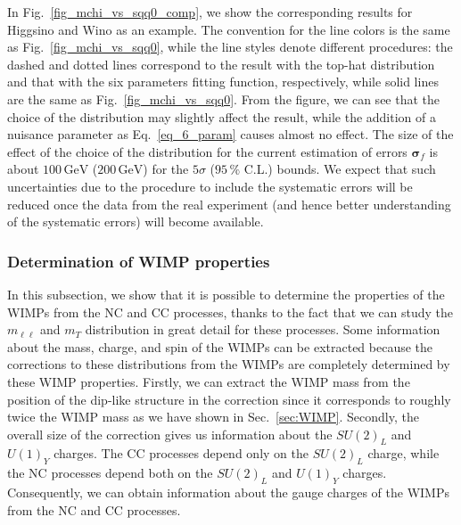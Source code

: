 \documentclass[12pt,twoside,book]{article}
\begin{document}
In Fig.~\ref{fig_mchi_vs_sqq0_comp}, we show the corresponding results for Higgsino and Wino as an example.
The convention for the line colors is the same as Fig.~\ref{fig_mchi_vs_sqq0}, while the line styles denote different procedures: the dashed and dotted lines correspond to the result with the top-hat distribution and that with the six parameters fitting function, respectively, while solid lines are the same as Fig.~\ref{fig_mchi_vs_sqq0}.
From the figure, we can see that the choice of the distribution may slightly affect the result, while the addition of a nuisance parameter as Eq.~\eqref{eq_6_param} causes almost no effect.
The size of the effect of the choice of the distribution for the current estimation of errors $\bm{\sigma}_f$ is about $100\,\mathrm{GeV}$ ($200\,\mathrm{GeV}$) for the $5\sigma$ ($95\,\%$ C.L.) bounds.
We expect that such uncertainties due to the procedure to include the systematic errors will be reduced once the data from the real experiment (and hence better understanding of the systematic errors) will become available.


\subsubsection{Determination of WIMP properties}
\label{sec_property}

In this subsection, we show that it is possible to determine the properties of the WIMPs from the NC and CC processes, thanks to the fact that we can study the $m_{\ell\ell}$ and $m_T$ distribution in great detail for these processes.
Some information about the mass, charge, and spin of the WIMPs can be extracted because the corrections to these distributions from the WIMPs are completely determined by these WIMP properties.
Firstly, we can extract the WIMP mass from the position of the dip-like structure in the correction since it corresponds to roughly twice the WIMP mass as we have shown in Sec.~\ref{sec:WIMP}.
Secondly, the overall size of the correction gives us information about the $SU(2)_L$ and $U(1)_Y$ charges.
The CC processes depend only on the $SU(2)_L$ charge, while the NC processes depend both on the $SU(2)_L$ and $U(1)_Y$ charges.
Consequently, we can obtain information about the gauge charges of the WIMPs from the NC and CC processes.
\end{document}
